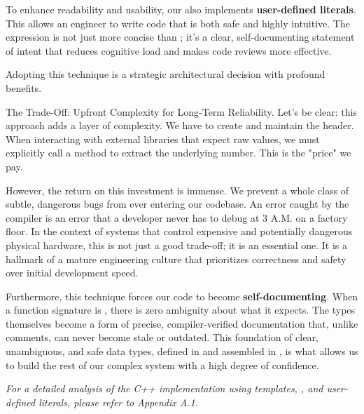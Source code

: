 To enhance readability and usability, our  also implements \textbf{user-defined literals}. This allows an engineer to write code that is both safe and highly intuitive. The expression  is not just more concise than ; it's a clear, self-documenting statement of intent that reduces cognitive load and makes code reviews more effective.


Adopting this technique is a strategic architectural decision with profound benefits.

\begin{principlebox}{The Trade-Off: Upfront Complexity for Long-Term Reliability.}
    Let's be clear: this approach adds a layer of complexity. We have to create and maintain the  header. When interacting with external libraries that expect raw  values, we must explicitly call a  method to extract the underlying number. This is the "price" we pay.
    
    However, the return on this investment is immense. We prevent a whole class of subtle, dangerous bugs from ever entering our codebase. An error caught by the compiler is an error that a developer never has to debug at 3 A.M. on a factory floor. In the context of systems that control expensive and potentially dangerous physical hardware, this is not just a good trade-off; it is an essential one. It is a hallmark of a mature engineering culture that prioritizes correctness and safety over initial development speed.
\end{principlebox}

Furthermore, this technique forces our code to become \textbf{self-documenting}. When a function signature is , there is zero ambiguity about what it expects. The types themselves become a form of precise, compiler-verified documentation that, unlike comments, can never become stale or outdated. This foundation of clear, unambiguous, and safe data types, defined in  and assembled in , is what allows us to build the rest of our complex system with a high degree of confidence.

\textit{For a detailed analysis of the C++ implementation using templates, , and user-defined literals, please refer to Appendix A.1.}






